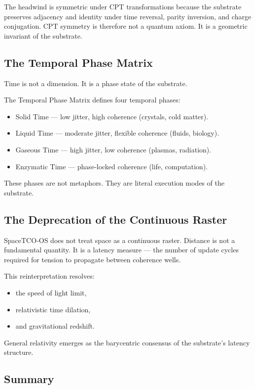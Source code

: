 \documentclass[reprint,amsmath,amssymb,aps,prl,floatfix]{revtex4-2}
\begin{document}
\begin{itemize}
The headwind is symmetric under CPT transformations because the substrate preserves adjacency and identity under time reversal, parity inversion, and charge conjugation. CPT symmetry is therefore not a quantum axiom.  
It is a geometric invariant of the substrate.

\subsection{The Temporal Phase Matrix}

Time is not a dimension.  
It is a phase state of the substrate.
\medskip

The Temporal Phase Matrix defines four temporal phases:
\begin{itemize}
\item Solid Time — low jitter, high coherence (crystals, cold matter).  
\item Liquid Time — moderate jitter, flexible coherence (fluids, biology).  
\item Gaseous Time — high jitter, low coherence (plasmas, radiation).  
\item Enzymatic Time — phase‑locked coherence (life, computation).
\end{itemize}
\medskip

These phases are not metaphors.  
They are literal execution modes of the substrate.

\subsection{The Deprecation of the Continuous Raster}

SpaceTCO‑OS does not treat space as a continuous raster.  
Distance is not a fundamental quantity.  
It is a latency measure — the number of update cycles required for tension to propagate between coherence wells.
\medskip

This reinterpretation resolves:
\begin{itemize}
\item the speed of light limit,  
\item relativistic time dilation,  
\item and gravitational redshift.
\end{itemize}
\medskip

General relativity emerges as the barycentric consensus of the substrate’s latency structure.

\subsection{Summary}


\end{itemize}
\end{document}
